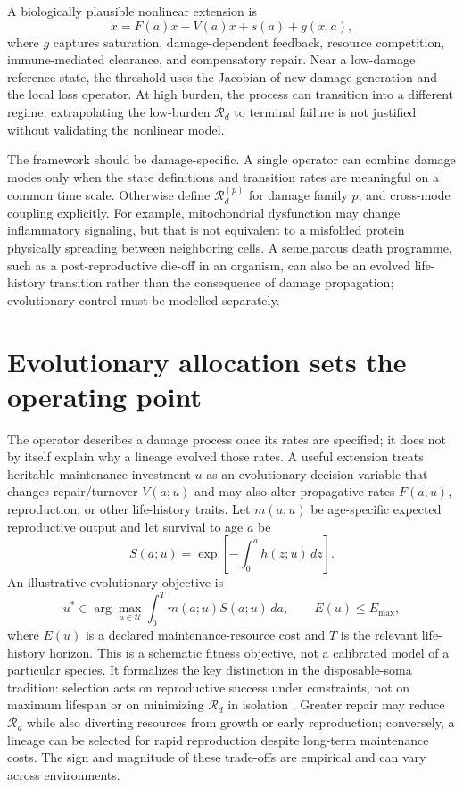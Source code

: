 \documentclass[11pt,a4paper]{article}
\newcommand{\Rd}{\mathcal{R}_{d}}
\begin{document}
A biologically plausible nonlinear extension is
\begin{equation}
\dot{x}=F(a)x-V(a)x+ s(a)+g(x,a),
\label{eq:nonlinear}
\end{equation}
where $g$ captures saturation, damage-dependent feedback, resource competition, immune-mediated clearance, and compensatory repair. Near a low-damage reference state, the threshold uses the Jacobian of new-damage generation and the local loss operator. At high burden, the process can transition into a different regime; extrapolating the low-burden $\Rd$ to terminal failure is not justified without validating the nonlinear model.

The framework should be damage-specific. A single operator can combine damage modes only when the state definitions and transition rates are meaningful on a common time scale. Otherwise define $\Rd^{(p)}$ for damage family $p$, and cross-mode coupling explicitly. For example, mitochondrial dysfunction may change inflammatory signaling, but that is not equivalent to a misfolded protein physically spreading between neighboring cells. A semelparous death programme, such as a post-reproductive die-off in an organism, can also be an evolved life-history transition rather than the consequence of damage propagation; evolutionary control must be modelled separately.

\section{Evolutionary allocation sets the operating point}

The operator describes a damage process once its rates are specified; it does not by itself explain why a lineage evolved those rates. A useful extension treats heritable maintenance investment $u$ as an evolutionary decision variable that changes repair/turnover $V(a;u)$ and may also alter propagative rates $F(a;u)$, reproduction, or other life-history traits. Let $m(a;u)$ be age-specific expected reproductive output and let survival to age $a$ be
\begin{equation}
S(a;u)=\exp\!\left[-\int_0^a h(z;u)\,dz\right].
\end{equation}
An illustrative evolutionary objective is
\begin{equation}
 u^*\in\arg\max_{u\in\mathcal U}\int_0^T m(a;u)S(a;u)\,da,
 \qquad E(u)\leq E_{\max},
\end{equation}
where $E(u)$ is a declared maintenance-resource cost and $T$ is the relevant life-history horizon. This is a schematic fitness objective, not a calibrated model of a particular species. It formalizes the key distinction in the disposable-soma tradition: selection acts on reproductive success under constraints, not on maximum lifespan or on minimizing $\Rd$ in isolation \citep{kirkwood1977}. Greater repair may reduce $\Rd$ while also diverting resources from growth or early reproduction; conversely, a lineage can be selected for rapid reproduction despite long-term maintenance costs. The sign and magnitude of these trade-offs are empirical and can vary across environments.
\end{document}

